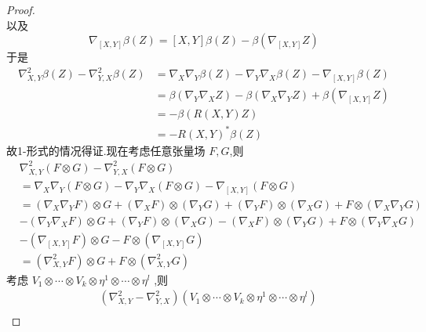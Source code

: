 \documentclass[../../几何与拓扑.tex]{subfiles}
\begin{document}
\begin{proof}
\[    \]以及 \[
     \nabla _{\left[ X,Y \right] }\beta \left( Z \right) = \left[ X,Y \right]\beta \left( Z \right)- \beta \left(  \nabla _{\left[ X,Y \right] }Z \right)   
    \]于是 \[
    \begin{aligned}
     \nabla ^{2}_{X,Y}\beta \left( Z \right) - \nabla ^{2}_{Y,X}\beta \left( Z \right)& =  \nabla _{X} \nabla _{Y}\beta\left( Z \right)  - \nabla _{Y} \nabla _{X}\beta \left( Z \right) - \nabla _{\left[ X,Y \right] }\beta \left( Z \right)  \\ 
      & = \beta \left(  \nabla _{Y} \nabla _{X}Z \right)-\beta \left(  \nabla _{X} \nabla _{Y}Z \right)+   \beta \left(  \nabla _{\left[ X,Y \right] }Z \right)\\ 
       & = -\beta \left( R\left( X,Y \right)Z  \right)  \\ 
        & = -R\left( X,Y \right)^{*}\beta \left( Z \right)  
    \end{aligned}
    \]故1-形式的情况得证.现在考虑任意张量场 \(  F,G  \),则 \[
    \begin{aligned}
    & \nabla ^{2}_{X,Y}\left( F\otimes G \right)- \nabla _{Y,X}^{2}\left( F\otimes G \right)   \\ 
     & =  \nabla _{X} \nabla _{Y}\left( F\otimes G \right)- \nabla _{Y} \nabla _{X}\left( F\otimes G \right)- \nabla _{\left[ X,Y \right] }\left( F\otimes G \right)\\ 
     & =    \left(  \nabla _{X} \nabla _{Y}F \right)\otimes G+ \left(  \nabla _{X}F \right)\otimes \left(  \nabla _{Y} G\right)+ \left(  \nabla _{Y}F \right)\otimes \left(  \nabla _{X}G \right)+ F\otimes \left(  \nabla _{X} \nabla _{Y}G \right)\\ 
      &-\left(  \nabla _{Y} \nabla _{X}F \right)\otimes G+ \left(  \nabla _{Y}F \right)\otimes \left(  \nabla _{X}G \right)-\left(  \nabla _{X}F \right)\otimes \left(  \nabla _{Y}G \right)+ F\otimes \left(  \nabla _{Y} \nabla _{X}G \right)\\ 
       &-\left(  \nabla _{\left[ X,Y \right] }F \right)\otimes G-F\otimes \left(  \nabla _{\left[ X,Y \right] }G \right)\\ 
        & =  \left(  \nabla _{X,Y}^{2}F \right) \otimes G+  F\otimes \left(  \nabla ^{2}_{X,Y}G \right)              
    \end{aligned}
    \] 考虑  \(  V_{1}\otimes \cdots \otimes V_{k}\otimes \eta ^{1}\otimes \cdots \otimes \eta ^{l}  \) ,则 \[
    \begin{aligned}
   & \left(  \nabla ^{2}_{X,Y}- \nabla _{Y,X}^{2} \right)\left( V_1\otimes \cdots \otimes V_{k}\otimes \eta ^{1}\otimes \cdots \otimes \eta ^{l} \right)\\ 

\end{aligned}\]
\end{proof}
\end{document}
